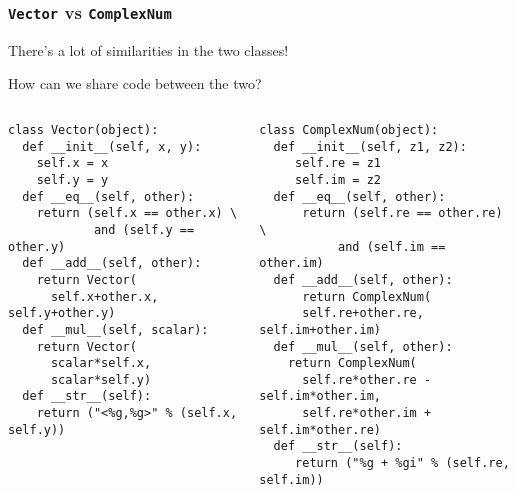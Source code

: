 \begin{frame}[fragile]\frametitle{\texttt{Vector} vs \texttt{ComplexNum}}

  There's a lot of similarities in the two classes!

  How can we share code between the two?

  \begin{columns}[t]
    \begin{column}{0.5\linewidth}
\begin{lstlisting}[basicstyle=\tiny\ttfamily,showstringspaces=false]
class Vector(object):
  def __init__(self, x, y):
    self.x = x
    self.y = y
  def __eq__(self, other):
    return (self.x == other.x) \
            and (self.y == other.y)
  def __add__(self, other):
    return Vector(
      self.x+other.x, self.y+other.y)
  def __mul__(self, scalar):
    return Vector(
      scalar*self.x,
      scalar*self.y)
  def __str__(self):
    return ("<%g,%g>" % (self.x, self.y))
\end{lstlisting}
    \end{column}
    
    \begin{column}{0.5\linewidth}
\begin{lstlisting}[basicstyle=\tiny\ttfamily,showstringspaces=false]
class ComplexNum(object):
  def __init__(self, z1, z2):
     self.re = z1
     self.im = z2
  def __eq__(self, other):
      return (self.re == other.re) \
           and (self.im == other.im)
  def __add__(self, other):
      return ComplexNum(
      self.re+other.re, self.im+other.im)
  def __mul__(self, other):
    return ComplexNum(
      self.re*other.re - self.im*other.im,
      self.re*other.im + self.im*other.re)
  def __str__(self):
     return ("%g + %gi" % (self.re, self.im))
\end{lstlisting}
    \end{column}
  \end{columns}
\end{frame}


